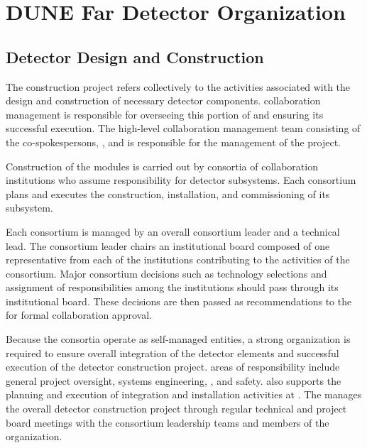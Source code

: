 \section{DUNE Far Detector Organization}   %
\subsection{Detector Design and Construction}   %
\label{sec:es-tc-det-const}

The   construction project refers collectively 
to the activities associated with the design and construction of 
necessary detector components.   collaboration management 
is responsible for overseeing this portion of   and 
ensuring its successful execution.  The high-level  
collaboration management team consisting of the co-spokespersons, 
, and  is responsible for the
management of the project.  

Construction of the  modules is carried out by 
consortia of collaboration institutions who assume responsibility 
for detector subsystems.  Each consortium plans and executes the 
construction, installation, and commissioning of its subsystem.

Each consortium is managed by an overall consortium leader 
and a technical lead.  The consortium leader chairs an institutional 
board composed of one representative from each of the %
institutions contributing to the activities of the consortium.  Major 
consortium decisions such as technology selections and assignment of 
responsibilities %
among the institutions should pass  
through its institutional board.  These decisions are then passed 
as recommendations to the   for formal collaboration approval.

Because the consortia operate as self-managed entities, a strong
 organization is required to ensure overall integration 
of the detector elements and successful execution of the detector
construction project.   areas of responsibility include 
general project oversight, systems engineering, , and 
safety.   also supports the planning and execution 
of integration and installation activities at .
The  manages the overall detector construction 
project through regular technical and project board meetings with 
the consortium leadership teams and members of the  
organization.


